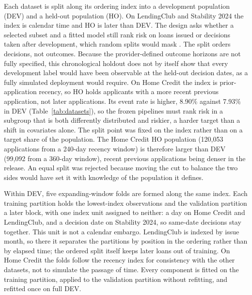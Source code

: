 \documentclass[final,5p,twocolumn]{elsarticle}
\begin{document}
Each dataset is split along its ordering index into a development population (DEV) and a held-out population (HO). On LendingClub and Stability 2024 the index is calendar time and HO is later than DEV. The design asks whether a selected subset and a fitted model still rank risk on loans issued or decisions taken after development, which random splits would mask \cite{bergmeir2012,gama2014}. The split orders decisions, not outcomes. Because the provider-defined outcome horizons are not fully specified, this chronological holdout does not by itself show that every development label would have been observable at the held-out decision dates, as a fully simulated deployment would require. On Home Credit the index is prior-application recency, so HO holds applicants with a more recent previous application, not later applications. Its event rate is higher, 8.90\% against 7.93\% in DEV (Table~\ref{tab:datasets}), so the frozen pipelines must rank risk in a subgroup that is both differently distributed and riskier, a harder target than a shift in covariates alone. The split point was fixed on the index rather than on a target share of the population. The Home Credit HO population (120,053 applications from a 240-day recency window) is therefore larger than DEV (99,092 from a 360-day window), recent previous applications being denser in the release. An equal split was rejected because moving the cut to balance the two sides would have set it with knowledge of the population it defines.

Within DEV, five expanding-window folds are formed along the same index. Each training partition holds the lowest-index observations and the validation partition a later block, with one index unit assigned to neither: a day on Home Credit and LendingClub, and a decision date on Stability 2024, so same-date decisions stay together. This unit is not a calendar embargo. LendingClub is indexed by issue month, so there it separates the partitions by position in the ordering rather than by elapsed time; the ordered split itself keeps later loans out of training. On Home Credit the folds follow the recency index for consistency with the other datasets, not to simulate the passage of time. Every component is fitted on the training partition, applied to the validation partition without refitting, and refitted once on full DEV.
\end{document}
